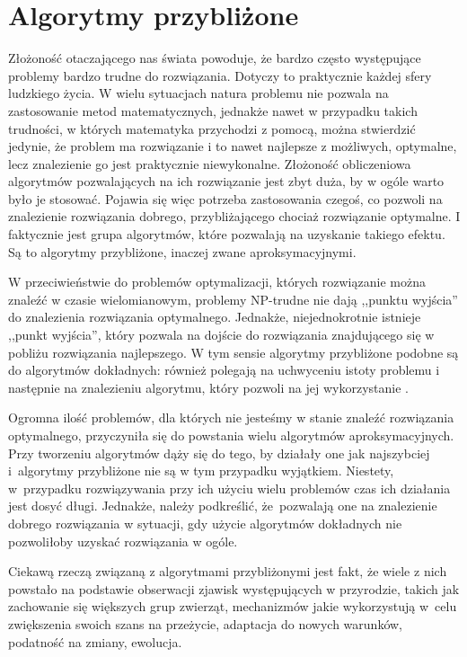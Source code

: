\chapter{Algorytmy przybliżone}
\label{cha:algorytmy}

Złożoność otaczającego nas świata powoduje, że bardzo często występujące problemy bardzo trudne do rozwiązania. Dotyczy to praktycznie każdej sfery ludzkiego życia. W wielu sytuacjach natura problemu nie pozwala na zastosowanie metod matematycznych, jednakże nawet w przypadku takich trudności, w których matematyka przychodzi z pomocą, można stwierdzić jedynie, że problem ma rozwiązanie i to nawet najlepsze z możliwych, optymalne, lecz znalezienie go jest praktycznie niewykonalne. Złożoność obliczeniowa algorytmów pozwalających na ich  rozwiązanie jest zbyt duża, by w ogóle warto było je stosować. Pojawia się więc potrzeba zastosowania czegoś, co pozwoli na znalezienie rozwiązania dobrego, przybliżającego chociaż rozwiązanie optymalne. I faktycznie jest grupa algorytmów, które pozwalają na uzyskanie takiego efektu. Są to algorytmy przybliżone, inaczej zwane aproksymacyjnymi.

W przeciwieństwie do problemów optymalizacji, których rozwiązanie można znaleźć w czasie wielomianowym, problemy NP-trudne nie dają ,,punktu wyjścia'' do znalezienia rozwiązania optymalnego. Jednakże, niejednokrotnie istnieje ,,punkt wyjścia'', który pozwala na dojście do rozwiązania znajdującego się w pobliżu rozwiązania najlepszego. W tym sensie algorytmy przybliżone podobne są do algorytmów dokładnych: również polegają na uchwyceniu istoty problemu i następnie na znalezieniu algorytmu, który pozwoli na jej  wykorzystanie \cite{APPROX}.

Ogromna ilość problemów, dla których nie jesteśmy w stanie znaleźć rozwiązania optymalnego, przyczyniła się do powstania wielu algorytmów aproksymacyjnych.  Przy tworzeniu algorytmów dąży się do tego, by działały one jak najszybciej i~algorytmy przybliżone nie są w tym przypadku wyjątkiem. Niestety, w~przypadku rozwiązywania przy ich użyciu wielu problemów czas ich działania jest dosyć długi. Jednakże, należy podkreślić, że~pozwalają one na znalezienie dobrego rozwiązania w sytuacji, gdy użycie algorytmów dokładnych nie pozwoliłoby uzyskać rozwiązania w ogóle.

Ciekawą rzeczą związaną z algorytmami przybliżonymi jest fakt, że wiele z nich powstało na podstawie obserwacji zjawisk występujących w przyrodzie, takich jak zachowanie się większych grup zwierząt, mechanizmów jakie wykorzystują w~celu zwiększenia swoich szans na przeżycie, adaptacja do nowych warunków, podatność na zmiany, ewolucja.


